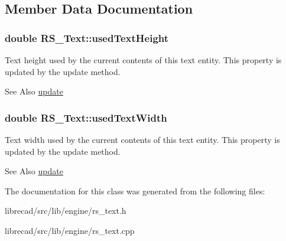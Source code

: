 \subsection{Member Data Documentation}
\hypertarget{classRS__Text_a2672c8b8c322348cf476d64bb719b726}{
\subsubsection[{used\-Text\-Height}]{\setlength{\rightskip}{0pt plus 5cm}double R\-S\-\_\-\-Text\-::used\-Text\-Height\hspace{0.3cm}{\ttfamily [protected]}}}\label{classRS__Text_a2672c8b8c322348cf476d64bb719b726}
Text height used by the current contents of this text entity. This property is updated by the update method. \begin{DoxySeeAlso}{See Also}
\hyperlink{classRS__Text_a67d067700252ffa99793f72431576dbd}{update} 
\end{DoxySeeAlso}
\hypertarget{classRS__Text_a5d903094e0ce9d102cf7e10bbf8d4595}{
\subsubsection[{used\-Text\-Width}]{\setlength{\rightskip}{0pt plus 5cm}double R\-S\-\_\-\-Text\-::used\-Text\-Width\hspace{0.3cm}{\ttfamily [protected]}}}\label{classRS__Text_a5d903094e0ce9d102cf7e10bbf8d4595}
Text width used by the current contents of this text entity. This property is updated by the update method. \begin{DoxySeeAlso}{See Also}
\hyperlink{classRS__Text_a67d067700252ffa99793f72431576dbd}{update} 
\end{DoxySeeAlso}


The documentation for this class was generated from the following files\-:\begin{DoxyCompactItemize}
\item 
librecad/src/lib/engine/rs\-\_\-text.\-h\item 
librecad/src/lib/engine/rs\-\_\-text.\-cpp\end{DoxyCompactItemize}
